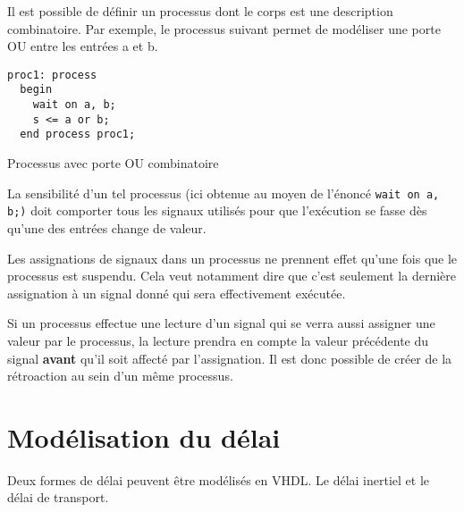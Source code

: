 \documentclass[letter, oneside]{book}
\begin{document}
Il est possible de définir un processus dont le corps est une
description combinatoire. Par exemple, le processus suivant permet de
modéliser une porte OU entre les entrées a et b. 

\begin{listing}[htbp]
\begin{verbatim}
proc1: process
  begin
    wait on a, b;
    s <= a or b;
  end process proc1;
\end{verbatim}
\caption{Processus avec porte OU combinatoire}
\end{listing}

La sensibilité d'un tel processus (ici obtenue au moyen de l'énoncé
\texttt{wait on a, b;)} doit comporter tous les signaux utilisés pour que
l'exécution se fasse dès qu'une des entrées change de valeur.

Les assignations de signaux dans un processus ne prennent effet qu'une
fois que le processus est suspendu. Cela veut notamment dire que c'est
seulement la dernière assignation à un signal donné qui sera
effectivement exécutée.

Si un processus effectue une lecture d'un signal qui se verra aussi
assigner une valeur par le processus, la lecture prendra en compte la
valeur précédente du signal \textbf{avant} qu'il soit affecté par
l'assignation. Il est donc possible de créer de la rétroaction au sein
d'un même processus.

\section{Modélisation du délai}
\label{sec:org534387d}

Deux formes de délai peuvent être modélisés en VHDL. Le délai inertiel
et le délai de transport.
\end{document}
